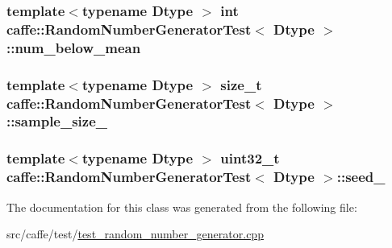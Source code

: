 \hypertarget{classcaffe_1_1_random_number_generator_test_ab2744cd1e3f41449e2b4b2ea9087f458}{
\subsubsection[{num\+\_\+below\+\_\+mean}]{\setlength{\rightskip}{0pt plus 5cm}template$<$typename Dtype $>$ int {\bf caffe\+::\+Random\+Number\+Generator\+Test}$<$ Dtype $>$\+::num\+\_\+below\+\_\+mean\hspace{0.3cm}{\ttfamily [protected]}}}\label{classcaffe_1_1_random_number_generator_test_ab2744cd1e3f41449e2b4b2ea9087f458}
\hypertarget{classcaffe_1_1_random_number_generator_test_a1e16c55d83c076ffe898f1db6f7cfc1d}{
\subsubsection[{sample\+\_\+size\+\_\+}]{\setlength{\rightskip}{0pt plus 5cm}template$<$typename Dtype $>$ size\+\_\+t {\bf caffe\+::\+Random\+Number\+Generator\+Test}$<$ Dtype $>$\+::sample\+\_\+size\+\_\+\hspace{0.3cm}{\ttfamily [protected]}}}\label{classcaffe_1_1_random_number_generator_test_a1e16c55d83c076ffe898f1db6f7cfc1d}
\hypertarget{classcaffe_1_1_random_number_generator_test_a8975ddeeefd466b91f1b39db1e526436}{
\subsubsection[{seed\+\_\+}]{\setlength{\rightskip}{0pt plus 5cm}template$<$typename Dtype $>$ uint32\+\_\+t {\bf caffe\+::\+Random\+Number\+Generator\+Test}$<$ Dtype $>$\+::seed\+\_\+\hspace{0.3cm}{\ttfamily [protected]}}}\label{classcaffe_1_1_random_number_generator_test_a8975ddeeefd466b91f1b39db1e526436}


The documentation for this class was generated from the following file\+:\begin{DoxyCompactItemize}
\item 
src/caffe/test/\hyperlink{test__random__number__generator_8cpp}{test\+\_\+random\+\_\+number\+\_\+generator.\+cpp}\end{DoxyCompactItemize}
